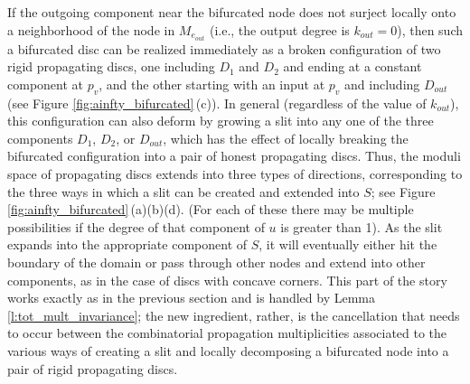 \documentclass[11pt,leqno]{amsart}
\numberwithin{equation}{section}
\begin{document}
If the outgoing component near the bifurcated node does not surject locally
onto a neighborhood of the node in $M_{e_{out}}$ (i.e., the output degree is $k_{out}=0$), 
then such a bifurcated disc can be realized immediately as a
broken configuration of two rigid propagating discs, one including $D_1$ and
$D_2$ and ending at a constant component at $p_v$, and the other starting
with an input at $p_v$ and including $D_{out}$ (see Figure
\ref{fig:ainfty_bifurcated}\,(c)). In general (regardless of the value of $k_{out}$), 
this configuration can also deform by growing a slit into any one of the three
components $D_1$, $D_2$, or $D_{out}$, which has the effect of locally
breaking the bifurcated configuration into a pair of honest propagating
discs. Thus, the moduli space of propagating discs extends
into three types of directions, corresponding to the three
ways in which a slit can be created and extended into $S$; see Figure
\ref{fig:ainfty_bifurcated}\,(a)(b)(d). (For each of these
there may be multiple possibilities if the degree of that component of $u$
is greater than 1). As the slit expands into the appropriate component of
$S$, it will eventually either hit the boundary of the domain or pass through
other nodes and extend into other components, as in the case of discs with concave corners.
This part of the story works exactly as in the previous section and is
handled by Lemma \ref{l:tot_mult_invariance}; the new ingredient, rather, is 
the cancellation that needs to occur between the combinatorial propagation multiplicities 
associated to the various ways of creating a slit and locally decomposing a bifurcated node into a pair of rigid
propagating discs.
\end{document}
